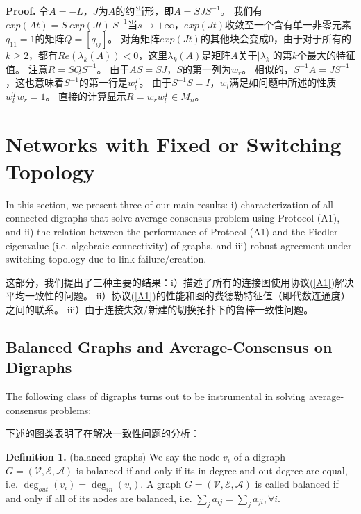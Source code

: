 \documentclass{article}
\begin{document}
\noindent \textbf{Proof.} 令$A=-L$，$J$为$A$的约当形，即$A=SJS^{-1}$。
我们有$exp(At) = S\ exp(Jt)\ S^{-1}$当$s\rightarrow +\infty$，$exp(Jt)$收敛至一个含有单一非零元素$q_{11}=1$的矩阵$Q=[q_{ij}]$。
对角矩阵$exp(Jt)$的其他块会变成0，由于对于所有的$k\ge2$，都有$Re(\lambda_k(A))<0$，这里$\lambda_k(A)$是矩阵$A$关于$|\lambda_k|$的第$k$个最大的特征值。
注意$R=SQS^{-1}$。
由于$AS=SJ$，$S$的第一列为$w_r$。
相似的，$S^{-1}A = JS^{-1}$，这也意味着$S^{-1}$的第一行是$w_l^T$。
由于$S^{-1}S=I$，$w_l$满足如问题中所述的性质$w_l^Tw_r=1$。
直接的计算显示$R=w_rw_l^T\in M_n$。

\section{Networks with Fixed or Switching Topology}
{\color[gray]{0.5}
\noindent In this section, we present three of our main results: 
i) characterization of all connected digraphs that solve average-consensus problem using Protocol (A1), 
and ii) the relation between the performance of Protocol (A1) and the Fiedler eigenvalue (i.e. algebraic connectivity) of graphs, 
and iii) robust agreement under switching topology due to link failure/creation.
}

\noindent 这部分，我们提出了三种主要的结果：i）描述了所有的连接图使用协议(\ref{A1})解决平均一致性的问题。
ii）协议(\ref{A1})的性能和图的费德勒特征值（即代数连通度）之间的联系。
iii）由于连接失效/新建的切换拓扑下的鲁棒一致性问题。

\subsection{Balanced Graphs and Average-Consensus on Digraphs}
{\color[gray]{0.5}
\noindent The following class of digraphs turns out to be instrumental in solving average-consensus problems:
}

\noindent 下述的图类表明了在解决一致性问题的分析：

{\color[gray]{0.5}
\noindent \textbf{Definition 1.} (balanced graphs) We say the node $v_i$ of a digraph $G=(\mathcal{V}, \mathcal{E}, \mathcal{A})$ is balanced if and only if its in-degree and out-degree are equal, i.e. $\deg_{out}(v_i)=\deg_{in}(v_i)$. 
A graph $G=(\mathcal{V}, \mathcal{E}, \mathcal{A})$ is called balanced if and only if all of its nodes are balanced, i.e. $\sum_{j}a_{ij} = \sum_{j}a_{ji}, \forall i$.
}
\end{document}
